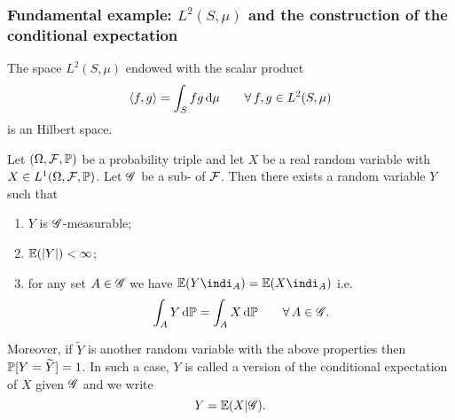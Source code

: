 \documentclass{article}
\begin{document}
\subsubsection*{Fundamental example: $L^{2}(S,\mu)$ and the construction of the conditional expectation}
\begin{theorem}
	The space $L^{2}(S,\mu)$ endowed with the scalar product
	\begin{equation*}
		\langle f,g \rangle=\int_{S}f g\mathop{}\!\mathrm{d}\mu\qquad\forall\, f,g\in L^{2}(S,\mu)
	\end{equation*}
	is an Hilbert space.
\end{theorem}
\begin{theorem}
	Let $(\Omega,\mathcal{F},\mathbb{P})$ be a probability triple and let $X$ be a real random variable with $X\in L^{1}(\Omega,\mathcal{F},\mathbb{P})$. Let $\mathscr{G}$ be a sub-\sa{} of $\mathcal{F}$. Then there exists a random variable $Y$ such that
	\begin{enumerate}
		\item $Y$ is $\mathscr{G}$-measurable;
		\item $\mathbb{E}(|Y|)<\infty$;
		\item for any set $A\in\mathscr{G}$ we have $\ev(Y\indi_{A})=\ev(X\indi_{A})$ i.e.
		\begin{equation*}
			\int_{A}Y\mathop{}\!\mathrm{d}\mathbb{P}=\int_{A}X\mathop{}\!\mathrm{d}\mathbb{P}\qquad\forall\, A\in\mathscr{G}.
		\end{equation*}
	\end{enumerate}
	Moreover, if $\widetilde{Y}$ is another random variable with the above properties then $\mathbb{P}[Y=\widetilde{Y}]=1$. In such a case, $Y$ is called a version of the conditional expectation of $X$ given $\mathscr{G}$ and we write
	\begin{equation*}
		Y=\mathbb{E}(X|\mathscr{G}).
	\end{equation*} 
\end{theorem}
\end{document}

